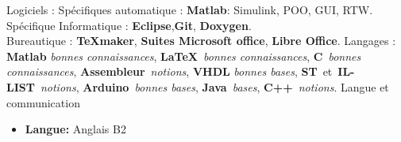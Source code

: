 \documentclass[11pt,a4paper,sans]{moderncv}        %
\newcommand{\myitem}{\textbullet}
\begin{document}
\begin{samepage}
%		
%
\tripleitemiseavecTitre%
{Logiciels :}%
{{%
	Spécifiques automatique : {\small \textbf{Matlab}: Simulink, POO, GUI, RTW}.\\
	Spécifique Informatique : {\small \textbf{Eclipse},\textbf{Git}, \textbf{Doxygen}}.\\
	Bureautique : {\small \textbf{\TeX maker}, \textbf{Suites Microsoft office}, \textbf{Libre Office}.}%
}}%
{Langages :}%
{%
	\textbf{Matlab} \textit{bonnes connaissances}, \textbf{\LaTeX}~\textit{bonnes connaissances}, \textbf{C}~\textit{bonnes connaissances}, 	\textbf{Assembleur}~\textit{notions}, \textbf{VHDL} \textit{bonnes bases}, \textbf{ST}~et~\textbf{IL-LIST}~\textit{notions}, \textbf{Arduino}~\textit{bonnes bases}, \textbf{Java}~\textit{bases}, \textbf{C++}~\textit{notions}.%
}%
{Langue et communication}%
{{%
	\begin{itemize}[label=\myitem]%
	\item \textbf{Langue: } {\small Anglais B2}%

\end{itemize}}}
\end{samepage}
\end{document}
